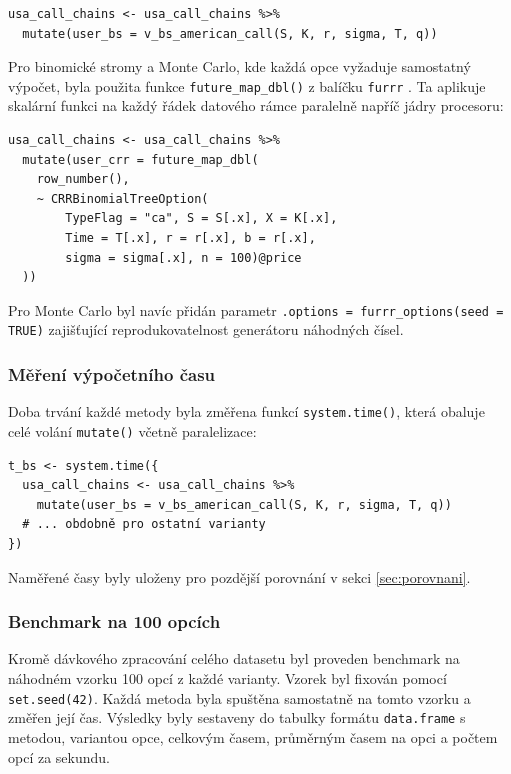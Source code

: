 \begin{verbatim}
usa_call_chains <- usa_call_chains %>%
  mutate(user_bs = v_bs_american_call(S, K, r, sigma, T, q))
\end{verbatim}

Pro binomické stromy a Monte Carlo, kde každá opce vyžaduje samostatný výpočet, byla použita funkce \texttt{future\_map\_dbl()} z balíčku \texttt{furrr} \citep{furrr}. Ta aplikuje skalární funkci na každý řádek datového rámce paralelně napříč jádry procesoru:

\begin{verbatim}
usa_call_chains <- usa_call_chains %>%
  mutate(user_crr = future_map_dbl(
    row_number(),
    ~ CRRBinomialTreeOption(
        TypeFlag = "ca", S = S[.x], X = K[.x],
        Time = T[.x], r = r[.x], b = r[.x],
        sigma = sigma[.x], n = 100)@price
  ))
\end{verbatim}

Pro Monte Carlo byl navíc přidán parametr \texttt{.options = furrr\_options(seed = TRUE)} zajišťující reprodukovatelnost generátoru náhodných čísel.

\subsubsection{Měření výpočetního času}

Doba trvání každé metody byla změřena funkcí \texttt{system.time()}, která obaluje celé volání \texttt{mutate()} včetně paralelizace:

\begin{verbatim}
t_bs <- system.time({
  usa_call_chains <- usa_call_chains %>%
    mutate(user_bs = v_bs_american_call(S, K, r, sigma, T, q))
  # ... obdobně pro ostatní varianty
})
\end{verbatim}

Naměřené časy byly uloženy pro pozdější porovnání v sekci \ref{sec:porovnani}.

\subsubsection{Benchmark na 100 opcích}

Kromě dávkového zpracování celého datasetu byl proveden benchmark na náhodném vzorku 100 opcí z každé varianty. Vzorek byl fixován pomocí \texttt{set.seed(42)}. Každá metoda byla spuštěna samostatně na tomto vzorku a změřen její čas. Výsledky byly sestaveny do tabulky formátu \texttt{data.frame} s metodou, variantou opce, celkovým časem, průměrným časem na opci a počtem opcí za sekundu.

